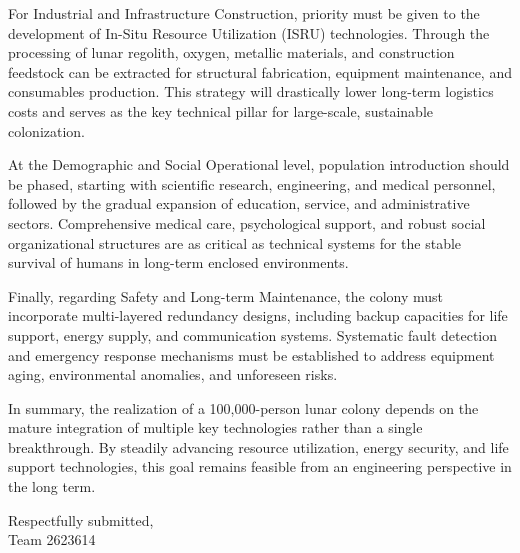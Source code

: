 {For Industrial and Infrastructure Construction, priority must be given to the development of In-Situ Resource Utilization (ISRU) technologies. Through the processing of lunar regolith, oxygen, metallic materials, and construction feedstock can be extracted for structural fabrication, equipment maintenance, and consumables production. This strategy will drastically lower long-term logistics costs and serves as the key technical pillar for large-scale, sustainable colonization.

At the Demographic and Social Operational level, population introduction should be phased, starting with scientific research, engineering, and medical personnel, followed by the gradual expansion of education, service, and administrative sectors. Comprehensive medical care, psychological support, and robust social organizational structures are as critical as technical systems for the stable survival of humans in long-term enclosed environments.

Finally, regarding Safety and Long-term Maintenance, the colony must incorporate multi-layered redundancy designs, including backup capacities for life support, energy supply, and communication systems. Systematic fault detection and emergency response mechanisms must be established to address equipment aging, environmental anomalies, and unforeseen risks.

In summary, the realization of a 100,000-person lunar colony depends on the mature integration of multiple key technologies rather than a single breakthrough. By steadily advancing resource utilization, energy security, and life support technologies, this goal remains feasible from an engineering perspective in the long term.

\begin{flushright}
Respectfully submitted,\\
Team 2623614
\end{flushright}
}